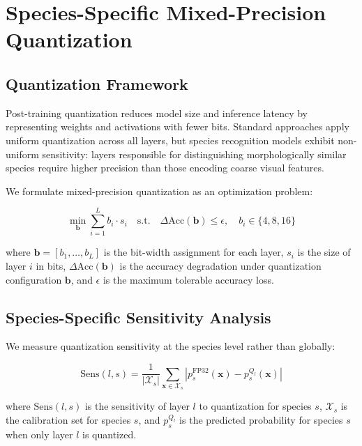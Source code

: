 \documentclass[11pt,a4paper]{article}
\begin{document}
\section{Species-Specific Mixed-Precision Quantization}
\label{sec:quantization}

\subsection{Quantization Framework}

Post-training quantization reduces model size and inference latency by representing weights and activations with fewer bits.
Standard approaches apply uniform quantization across all layers, but species recognition models exhibit non-uniform sensitivity: layers responsible for distinguishing morphologically similar species require higher precision than those encoding coarse visual features.

We formulate mixed-precision quantization as an optimization problem:

\begin{equation}
    \min_{\mathbf{b}} \sum_{i=1}^{L} b_i \cdot s_i \quad \text{s.t.} \quad \Delta\text{Acc}(\mathbf{b}) \leq \epsilon, \quad b_i \in \{4, 8, 16\}
\end{equation}

\noindent where $\mathbf{b} = [b_1, \ldots, b_L]$ is the bit-width assignment for each layer, $s_i$ is the size of layer $i$ in bits, $\Delta\text{Acc}(\mathbf{b})$ is the accuracy degradation under quantization configuration $\mathbf{b}$, and $\epsilon$ is the maximum tolerable accuracy loss.

\subsection{Species-Specific Sensitivity Analysis}

We measure quantization sensitivity at the species level rather than globally:

\begin{equation}
    \text{Sens}(l, s) = \frac{1}{|\mathcal{X}_s|} \sum_{\mathbf{x} \in \mathcal{X}_s} |p_s^{\text{FP32}}(\mathbf{x}) - p_s^{Q_l}(\mathbf{x})|
\end{equation}

\noindent where $\text{Sens}(l, s)$ is the sensitivity of layer $l$ to quantization for species $s$, $\mathcal{X}_s$ is the calibration set for species $s$, and $p_s^{Q_l}$ is the predicted probability for species $s$ when only layer $l$ is quantized.
\end{document}
